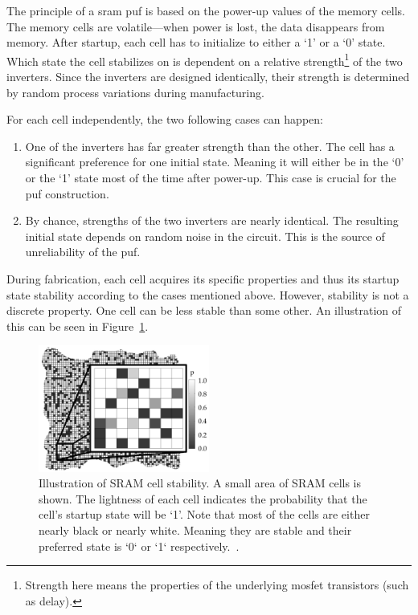 The principle of a \gls{sram} \gls{puf} is based on the power-up values of the memory cells. The memory cells are volatile---when power is lost, the data disappears from memory. After startup, each cell has to initialize to either a `1' or a `0' state. Which state the cell stabilizes on is dependent on a relative strength\footnote{Strength here means the properties of the underlying \gls{mosfet} transistors (such as delay).} of the two inverters. Since the inverters are designed identically, their strength is determined by random process variations during manufacturing.\cite{Maes2010}

For each cell independently, the two following cases can happen:

\begin{enumerate}
    \item One of the inverters has far greater strength than the other. The cell has a significant preference for one initial state. Meaning it will either be in the `0' or the `1' state most of the time after power-up. This case is crucial for the \gls{puf} construction.
    \item By chance, strengths of the two inverters are nearly identical. The resulting initial state depends on random noise in the circuit. This is the source of unreliability of the \gls{puf}.
\end{enumerate}

During fabrication, each cell acquires its specific properties and thus its startup state stability according to the cases mentioned above. However, stability is not a discrete property. One cell can be less stable than some other. An illustration of this can be seen in Figure~\ref{fig:sram_puf_stability}.

\begin{figure}[ht!]
    \centering
    \captionsetup{justification=justified,margin=0.5cm}
    \includegraphics[width=0.5\textwidth]{images/sram_puf_stability.jpg}
    \caption[Illustration of SRAM cell stability.]{Illustration of SRAM cell stability. A small area of SRAM cells is shown. The lightness of each cell indicates the probability that the cell's startup state will be `1'. Note that most of the cells are either nearly black or nearly white. Meaning they are stable and their preferred state is `0` or `1` respectively.~\cite{Holcomb2009}.}
    \label{fig:sram_puf_stability}
\end{figure}

